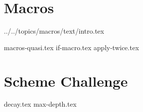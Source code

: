\documentclass{exam}
\begin{document}
\newpage
\section{Macros}
 {../../topics/macros/text/}{intro.tex}
\begin{questions}
{macros-quasi.tex}
{if-macro.tex}
{apply-twice.tex}
\end{questions}

\newpage
\section{Scheme Challenge}
\begin{questions}
{decay.tex}
{max-depth.tex}
\end{questions}

\end{document}
